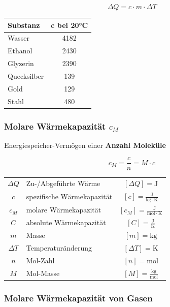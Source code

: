 \begin{minipage}{0.4\linewidth}
	$$ \boxed{ \Delta Q = c \cdot m \cdot \Delta T  } $$	
\end{minipage}
\hfill
\begin{minipage}{0.5\linewidth}
	\begin{center}
		\begin{tabular}{lc}
			\textbf{Substanz} & \textbf{c bei 20°C}\\ \hline
			Wasser      & 4182 \\
			Ethanol     & 2430 \\
			Glyzerin    & 2390 \\
			Quecksilber & 139 \\
			Gold        & 129 \\
			Stahl       & 480 \\
		\end{tabular}
	\end{center}
\end{minipage}

\subsubsection{Molare Wärmekapazität $c_M$}
Energiespeicher-Vermögen einer \textbf{Anzahl Moleküle}

$$ \boxed{ c_M = \frac{c}{n} = M \cdot c } $$


\begin{tabular}{c l c}
	$\Delta Q$ & Zu-/Abgeführte Wärme & $[\Delta Q] = \mathrm{J}$ \\
	\rule{0pt}{8pt}$c$ & spezifische Wärmekapazität & $[c] = \mathrm{\frac{J}{kg \cdot K}}$ \\
	\rule{0pt}{8pt}$c_M$ & molare Wärmekapazität & $[c_M] = \mathrm{\frac{J}{mol \cdot K}}$ \\
	\rule{0pt}{8pt}$C$ & absolute Wärmekapazität & $[C] = \mathrm{\frac{J}{K}}$ \\
	$m$ & Masse & $[m] = \mathrm{kg}$ \\
	$\Delta T$ & Temperaturänderung & $[\Delta T] = \mathrm{K}$ \\
	$n$ & Mol-Zahl & $[n] = \mathrm{mol}$ \\
	\rule{0pt}{8pt}$M$ & Mol-Masse & $[M] = \mathrm{\frac{kg}{mol}}$ \\
\end{tabular}


\subsubsection{Molare Wärmekapazität von Gasen}

